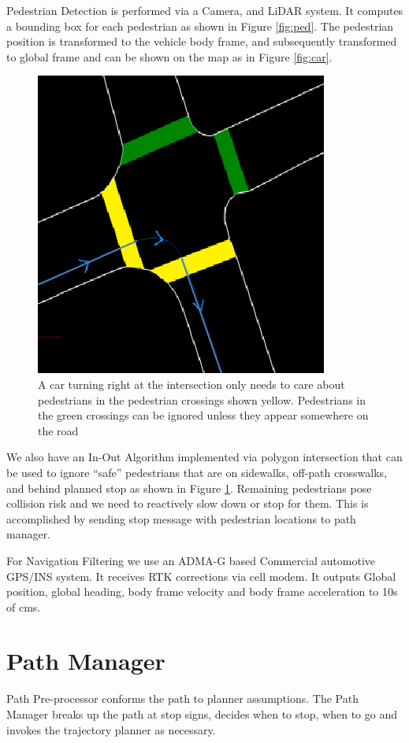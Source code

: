 \documentclass[letterpaper, 10 pt, conference]{ieeeconf}  %
\begin{document}
Pedestrian Detection is performed via a Camera, and LiDAR system. It computes a bounding 
box for each pedestrian as shown in Figure \ref{fig:ped}. The pedestrian position is 
transformed to the vehicle body frame, and subsequently transformed to global frame and 
can be shown on the map as in Figure \ref{fig:car}.

\begin{figure}[thpb]
  \centering
  \includegraphics[width=0.5\columnwidth]{graphics/IntersectionCrosswalks.png}
  \caption{A car turning right at the intersection only needs to care about pedestrians in the 
pedestrian crossings shown yellow. Pedestrians in the green crossings can be ignored unless they
appear somewhere on the road}
  \label{fig:intersect}
\end{figure}

We also have an In-Out Algorithm implemented via polygon intersection that can be used to
ignore “safe” pedestrians that are on sidewalks, off-path crosswalks, and behind planned stop
as shown in Figure \ref{fig:intersect}.
Remaining pedestrians pose collision risk and we need to reactively slow down or stop for them.
This is accomplished by sending stop message with pedestrian locations to path manager.

For Navigation Filtering we use an ADMA-G based Commercial automotive GPS/INS system.
It receives RTK corrections via cell modem. It outputs Global position, global heading,
body frame velocity and body frame acceleration to 10s of cms.

\section{Path Manager} \label{sec:pathmanager}


Path Pre-processor conforms the path to planner assumptions. The Path Manager breaks up the
path at stop signs, decides when to stop, when to go and invokes the trajectory planner
as necessary. 
\end{document}
